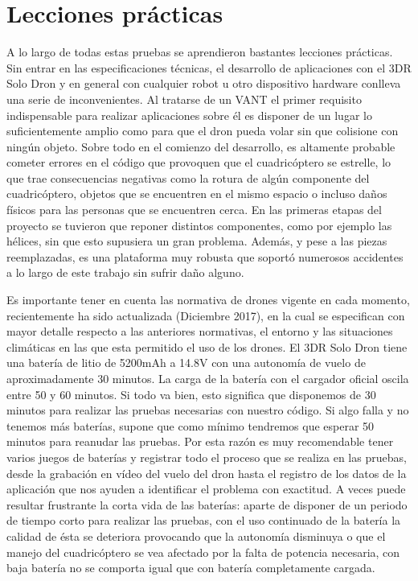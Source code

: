 \section{Lecciones prácticas}
A lo largo de todas estas pruebas se aprendieron bastantes lecciones prácticas. Sin entrar en las especificaciones técnicas, el desarrollo de aplicaciones con el 3DR Solo Dron y en general con cualquier robot u otro dispositivo hardware conlleva una serie de inconvenientes. Al tratarse de un VANT el primer requisito indispensable para realizar aplicaciones sobre él es disponer de un lugar lo suficientemente amplio como para que el dron pueda volar sin que colisione con ningún objeto. Sobre todo en el comienzo del desarrollo, es altamente probable cometer errores en el código que provoquen que el cuadricóptero se estrelle, lo que trae consecuencias negativas como la rotura de algún componente del cuadricóptero, objetos que se encuentren en el mismo espacio o incluso daños físicos para las personas que se encuentren cerca. En las primeras etapas del proyecto se tuvieron que reponer distintos componentes, como por ejemplo las hélices, sin que esto supusiera un gran problema. Además, y pese a las piezas reemplazadas, es una plataforma muy robusta que soportó numerosos accidentes a lo largo de este trabajo sin sufrir daño alguno.

Es importante tener en cuenta las normativa de drones vigente en cada momento, recientemente ha sido actualizada (Diciembre 2017), en la cual se especifican con mayor detalle respecto a las anteriores normativas, el entorno y las situaciones climáticas en las que esta permitido el uso de los drones. 
El 3DR Solo Dron tiene una batería de litio de 5200mAh a 14.8V con una autonomía de vuelo de aproximadamente 30 minutos. La carga de la batería con el cargador oficial oscila entre 50 y 60 minutos. Si todo va bien, esto significa que disponemos de 30 minutos para realizar las pruebas necesarias con nuestro código. Si algo falla y no tenemos más baterías, supone que como mínimo tendremos que esperar 50 minutos para reanudar las pruebas. Por esta razón es muy recomendable tener varios juegos de baterías y registrar todo el proceso que se realiza en las pruebas, desde la grabación en vídeo del vuelo del dron hasta el registro de los datos de la aplicación que nos ayuden a identificar el problema con exactitud. A veces puede resultar frustrante la corta vida de las baterías: aparte de disponer de un periodo de tiempo corto para realizar las pruebas, con el uso continuado de la batería la calidad de ésta se deteriora provocando que la autonomía disminuya o que el manejo del cuadricóptero se vea afectado por la falta de potencia necesaria, con baja batería no se comporta igual que con batería completamente cargada.

